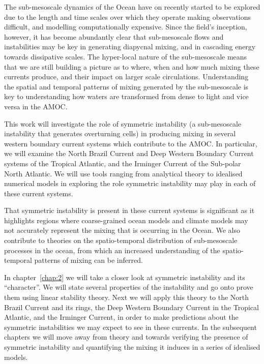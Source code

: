 The sub-mesoscale dynamics of the Ocean have on recently started to be explored due to the length and time scales over which they operate making observations difficult, and modelling computationally expensive. Since the field's inception, however, it has become abundantly clear that sub-mesoscale flows and instabilities may be key in generating diapycnal mixing, and in cascading energy towards dissipative scales. The hyper-local nature of the sub-mesoscale means that we are still building a picture as to where, when and how much mixing these currents produce, and their impact on larger scale circulations. Understanding the spatial and temporal patterns of mixing generated by the sub-mesoscale is key to understanding how waters are transformed from dense to light and vice versa in the AMOC.

This work will investigate the role of symmetric instability (a sub-mesoscale instability that generates overturning cells) in producing mixing in several western boundary current systems which contribute to the AMOC. In particular, we will examine the North Brazil Current and Deep Western Boundary Current systems of the Tropical Atlantic, and the Irminger Current of the Sub-polar North Atlantic. We will use tools ranging from analytical theory to idealised numerical models in exploring the role symmetric instability may play in each of these current systems.

That symmetric instability is present in these current systems is significant as it highlights regions where coarse-grained ocean models and climate models may not accurately represent the mixing that is occurring in the Ocean. We also contribute to theories on the spatio-temporal distribution of sub-mesoscale processes in the ocean, from which an increased understanding of the spatio-temporal patterns of mixing can be inferred.

In chapter~\ref{chap:2} we will take a closer look at symmetric instability and its ``character''. We will state several properties of the instability and go onto prove them using linear stability theory. Next we will apply this theory to the North Brazil Current and its rings, the Deep Western Boundary Current in the Tropical Atlantic, and the Irminger Current, in order to make predictions about the symmetric instabilities we may expect to see in these currents. In the subsequent chapters we will move away from theory and towards verifying the presence of symmetric instability and quantifying the mixing it induces in a series of idealised models.

